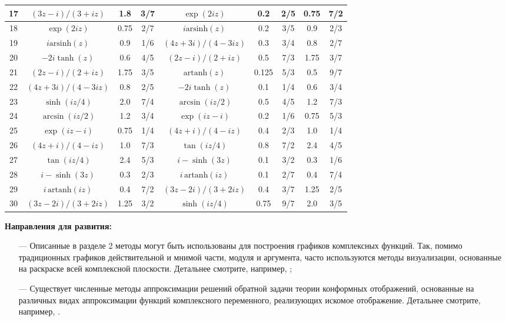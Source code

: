 \documentclass{article}
\theoremstyle{definition}
\begin{document}
\begin{longtable}[c]{|c||c|c|c||c|c|c|c|c|}
17 & $(3z-i)/(3+iz)$ & 1.8 & 3/7 & $\exp(2iz)$                & 0.2   & 2/5 & 0.75 & 7/2 \\ \hline
18 & $\exp(2iz)$ & 0.75 & 2/7 &     $i\textrm{arsinh}(z)$     & 0.2   & 3/5 & 0.9  & 2/3 \\ \hline
19 & $i\textrm{arsinh}(z)$ & 0.9 & 1/6 & $(4z+3i)/(4-3iz)$    & 0.3   & 3/4 & 0.8  & 2/7 \\ \hline
20 & $-2i\tanh(z)$ & 0.6 & 4/5 &   $(2z-i)/(2+iz)$            & 0.5   & 7/3 & 1.75 & 3/7 \\ \hline
21 & $(2z-i)/(2+iz)$ & 1.75 & 3/5 & $\textrm{artanh}(z)$      & 0.125 & 5/3 & 0.5  & 9/7 \\ \hline
22 & $(4z+3i)/(4-3iz)$ & 0.8 & 2/5 & $-2i\tanh(z)$            & 0.1   & 1/4 & 0.6  & 3/4 \\ \hline
23 & $\sinh(iz/4)$ & 2.0 & 7/4 &   $\arcsin(iz/2)$            & 0.5   & 4/5 & 1.2  & 7/3 \\ \hline
24 & $\arcsin(iz/2)$ & 1.2 & 3/4 & $\exp(iz- i)$              & 0.2   & 1/6 & 0.75 & 5/3 \\ \hline
25 & $\exp(iz- i)$ & 0.75 & 1/4 &  $(4z+i)/(4-iz)$            & 0.4   & 2/3 & 1.0  & 1/4 \\ \hline
26 & $(4z+i)/(4-iz)$ & 1.0 & 7/3 & $\tan(iz/4)$               & 0.8   & 7/2 & 2.4  & 4/5 \\ \hline
27 & $\tan(iz/4)$ & 2.4 & 5/3 &    $i - \sinh(3z)$            & 0.1   & 3/2 & 0.3  & 1/6 \\ \hline
28 & $i - \sinh(3z)$ & 0.3 & 2/3 & $i\,\textrm{artanh}(iz)$   & 0.1   & 2/7 & 0.4  & 7/4 \\ \hline
29 & $i\,\textrm{artanh}(iz)$ & 0.4 & 7/2 & $(3z-2i)/(3+2iz)$ & 0.4   & 3/7 & 1.25 & 2/5 \\ \hline
30 & $(3z-2i)/(3+2iz)$ & 1.25 & 3/2 & $\sinh(iz/4)$           & 0.75  & 9/7 & 2.0  & 3/5 \\ \hline
\end{longtable}
\vspace*{0.1cm} \noindent
\textbf{Направления для развития:}
\begin{itemize}
\item[---] Описанные в разделе 2 методы могут быть использованы для построения графиков комплексных функций. Так, помимо традиционных графиков действительной и мнимой части, модуля и аргумента, часто используются методы визуализации, основанные на раскраске всей комплексной плоскости. Детальнее смотрите, например, \cite{Eng}\cite{online};
\item[---] Существует численные методы аппроксимации решений обратной задачи теории конформных отображений, основанные на различных видах аппроксимации функций комплексного переменного, реализующих искомое отображение. Детальнее смотрите, например, \cite{1}.
\end{itemize}
\end{document}
